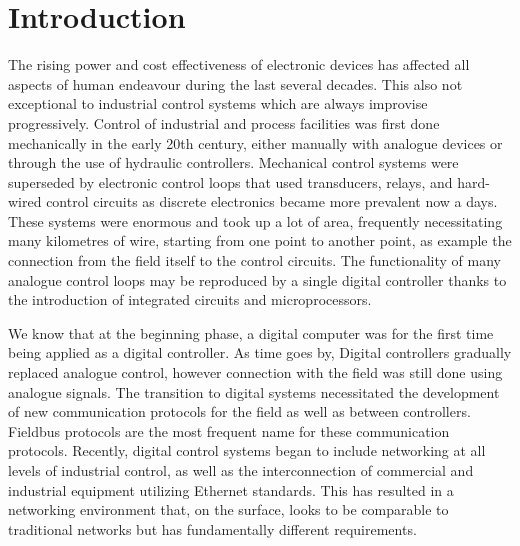 \section{Introduction}
The rising power and cost effectiveness of electronic devices has affected all aspects of human endeavour during the last several decades. This also not exceptional to industrial control systems which are always improvise progressively. Control of industrial and process facilities was first done mechanically in the early 20th century, either manually with analogue devices or through the use of hydraulic controllers. Mechanical control systems were superseded by electronic control loops that used transducers, relays, and hard-wired control circuits as discrete electronics became more prevalent now a days. These systems were enormous and took up a lot of area, frequently necessitating many kilometres of wire, starting from one point to another point, as example the connection from the field itself to the control circuits. The functionality of many analogue control loops may be reproduced by a single digital controller thanks to the introduction of integrated circuits and microprocessors.

We know that at the beginning phase, a digital computer was for the first time being applied as a digital controller. As time goes by, Digital controllers gradually replaced analogue control, however connection with the field was still done using analogue signals. The transition to digital systems necessitated the development of new communication protocols for the field as well as between controllers. Fieldbus protocols are the most frequent name for these communication protocols. Recently, digital control systems began to include networking at all levels of industrial control, as well as the interconnection of commercial and industrial equipment utilizing Ethernet standards. This has resulted in a networking environment that, on the surface, looks to be comparable to traditional networks but has fundamentally different requirements.

